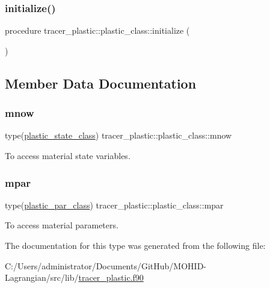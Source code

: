\subsubsection{\texorpdfstring{initialize()}{initialize()}}
{\footnotesize\ttfamily procedure tracer\+\_\+plastic\+::plastic\+\_\+class\+::initialize (\begin{DoxyParamCaption}{ }\end{DoxyParamCaption})\hspace{0.3cm}{\ttfamily [private]}}



\subsection{Member Data Documentation}
\mbox{\label{structtracer__plastic_1_1plastic__class_ab03eb153c19d97a9ac0f76bb3218d242}} 
\subsubsection{\texorpdfstring{mnow}{mnow}}
{\footnotesize\ttfamily type(\mbox{\hyperlink{structtracer__plastic_1_1plastic__state__class}{plastic\+\_\+state\+\_\+class}}) tracer\+\_\+plastic\+::plastic\+\_\+class\+::mnow\hspace{0.3cm}{\ttfamily [private]}}



To access material state variables. 

\mbox{\label{structtracer__plastic_1_1plastic__class_a5f8a2635cad07f5b1e30e97cf7754e98}} 
\subsubsection{\texorpdfstring{mpar}{mpar}}
{\footnotesize\ttfamily type(\mbox{\hyperlink{structtracer__plastic_1_1plastic__par__class}{plastic\+\_\+par\+\_\+class}}) tracer\+\_\+plastic\+::plastic\+\_\+class\+::mpar\hspace{0.3cm}{\ttfamily [private]}}



To access material parameters. 



The documentation for this type was generated from the following file\+:\begin{DoxyCompactItemize}
\item 
C\+:/\+Users/administrator/\+Documents/\+Git\+Hub/\+M\+O\+H\+I\+D-\/\+Lagrangian/src/lib/\mbox{\hyperlink{tracer__plastic_8f90}{tracer\+\_\+plastic.\+f90}}\end{DoxyCompactItemize}
